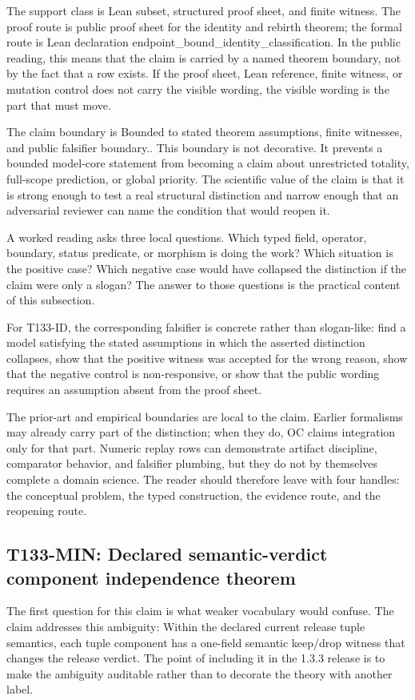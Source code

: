 The support class is Lean subset, structured proof sheet, and finite witness. The proof route is public proof sheet for the identity and rebirth theorem; the formal route is Lean declaration endpoint\_bound\_identity\_classification. In the public reading, this means that the claim is carried by a named theorem boundary, not by the fact that a row exists. If the proof sheet, Lean reference, finite witness, or mutation control does not carry the visible wording, the visible wording is the part that must move.

The claim boundary is Bounded to stated theorem assumptions, finite witnesses, and public falsifier boundary.. This boundary is not decorative. It prevents a bounded model-core statement from becoming a claim about unrestricted totality, full-scope prediction, or global priority. The scientific value of the claim is that it is strong enough to test a real structural distinction and narrow enough that an adversarial reviewer can name the condition that would reopen it.

A worked reading asks three local questions. Which typed field, operator, boundary, status predicate, or morphism is doing the work? Which situation is the positive case? Which negative case would have collapsed the distinction if the claim were only a slogan? The answer to those questions is the practical content of this subsection.

For T133-ID, the corresponding falsifier is concrete rather than slogan-like: find a model satisfying the stated assumptions in which the asserted distinction collapses, show that the positive witness was accepted for the wrong reason, show that the negative control is non-responsive, or show that the public wording requires an assumption absent from the proof sheet.

The prior-art and empirical boundaries are local to the claim. Earlier formalisms may already carry part of the distinction; when they do, OC claims integration only for that part. Numeric replay rows can demonstrate artifact discipline, comparator behavior, and falsifier plumbing, but they do not by themselves complete a domain science. The reader should therefore leave with four handles: the conceptual problem, the typed construction, the evidence route, and the reopening route.

\subsection{T133-MIN: Declared semantic-verdict component independence theorem}
The first question for this claim is what weaker vocabulary would confuse. The claim addresses this ambiguity: Within the declared current release tuple semantics, each tuple component has a one-field semantic keep/drop witness that changes the release verdict. The point of including it in the 1.3.3 release is to make the ambiguity auditable rather than to decorate the theory with another label.

